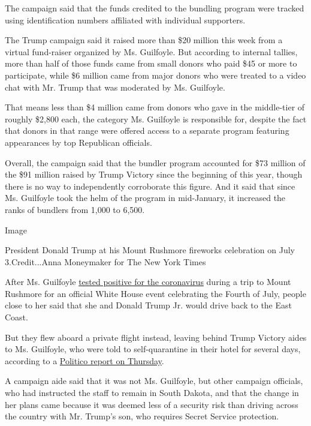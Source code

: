 The campaign said that the funds credited to the bundling program were
tracked using identification numbers affiliated with individual
supporters.

The Trump campaign said it raised more than \$20 million this week from
a virtual fund-raiser organized by Ms. Guilfoyle. But according to
internal tallies, more than half of those funds came from small donors
who paid \$45 or more to participate, while \$6 million came from major
donors who were treated to a video chat with Mr. Trump that was
moderated by Ms. Guilfoyle.

That means less than \$4 million came from donors who gave in the
middle-tier of roughly \$2,800 each, the category Ms. Guilfoyle is
responsible for, despite the fact that donors in that range were offered
access to a separate program featuring appearances by top Republican
officials.

Overall, the campaign said that the bundler program accounted for \$73
million of the \$91 million raised by Trump Victory since the beginning
of this year, though there is no way to independently corroborate this
figure. And it said that since Ms. Guilfoyle took the helm of the
program in mid-January, it increased the ranks of bundlers from 1,000 to
6,500.

Image

President Donald Trump at his Mount Rushmore fireworks celebration on
July 3.Credit...Anna Moneymaker for The New York Times

After Ms. Guilfoyle
\href{https://www.nytimes.com/2020/07/03/us/politics/kimberly-guilfoyle-trump-campaign-coronavirus.html}{tested
positive for the coronavirus} during a trip to Mount Rushmore for an
official White House event celebrating the Fourth of July, people close
to her said that she and Donald Trump Jr. would drive back to the East
Coast.

But they flew aboard a private flight instead, leaving behind Trump
Victory aides to Ms. Guilfoyle, who were told to self-quarantine in
their hotel for several days, according to a
\href{https://www.politico.com/news/2020/07/23/kimberly-guilfoyle-trump-fundraising-380380}{Politico
report on Thursday}.

A campaign aide said that it was not Ms. Guilfoyle, but other campaign
officials, who had instructed the staff to remain in South Dakota, and
that the change in her plans came because it was deemed less of a
security risk than driving across the country with Mr. Trump's son, who
requires Secret Service protection.

